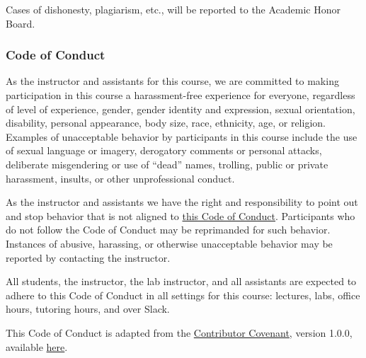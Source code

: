 \documentclass[
  letterpaper,
  DIV=11,
  numbers=noendperiod]{scrartcl}
\begin{document}
Cases of dishonesty, plagiarism, etc., will be reported to the Academic
Honor Board.

\hypertarget{conduct}{%
\subsubsection{Code of Conduct}\label{conduct}}

As the instructor and assistants for this course, we are committed to
making participation in this course a harassment-free experience for
everyone, regardless of level of experience, gender, gender identity and
expression, sexual orientation, disability, personal appearance, body
size, race, ethnicity, age, or religion. Examples of unacceptable
behavior by participants in this course include the use of sexual
language or imagery, derogatory comments or personal attacks, deliberate
misgendering or use of ``dead'' names, trolling, public or private
harassment, insults, or other unprofessional conduct.

As the instructor and assistants we have the right and responsibility to
point out and stop behavior that is not aligned to
\href{syllabus.qmd\#conduct}{this Code of Conduct}. Participants who do
not follow the Code of Conduct may be reprimanded for such behavior.
Instances of abusive, harassing, or otherwise unacceptable behavior may
be reported by contacting the instructor.

\begin{tcolorbox}[enhanced jigsaw, toptitle=1mm, toprule=.15mm, colframe=quarto-callout-important-color-frame, colback=white, breakable, opacityback=0, opacitybacktitle=0.6, coltitle=black, rightrule=.15mm, bottomrule=.15mm, titlerule=0mm, leftrule=.75mm, colbacktitle=quarto-callout-important-color!10!white, title=\textcolor{quarto-callout-important-color}{\faExclamation}\hspace{0.5em}{Important}, left=2mm, arc=.35mm, bottomtitle=1mm]

All students, the instructor, the lab instructor, and all assistants are
expected to adhere to this Code of Conduct in all settings for this
course: lectures, labs, office hours, tutoring hours, and over Slack.

\end{tcolorbox}

This Code of Conduct is adapted from the
\href{http://contributor-covenant.org/}{Contributor Covenant}, version
1.0.0, available
\href{http://contributor-covenant.org/version/1/0/0/}{here}.
\end{document}
